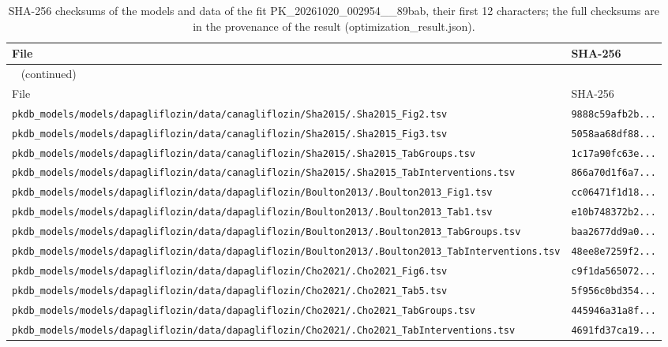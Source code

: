 \begin{longtable}{ll}
\caption{SHA-256 checksums of the models and data of the fit PK\_20261020\_002954\_\_89bab, their first 12 characters; the full checksums are in the provenance of the result (optimization\_result.json).}\label{tab:checksums:PK_20261020_002954__89bab} \\
\toprule
File & SHA-256 \\
\midrule
\endfirsthead
\multicolumn{2}{l}{\small\tablename~\thetable{} (continued)} \\
\toprule
File & SHA-256 \\
\midrule
\endhead
\bottomrule
\endlastfoot
\texttt{pkdb\_models/models/dapagliflozin/data/canagliflozin/Sha2015/.Sha2015\_Fig2.tsv} & \texttt{9888c59afb2b...} \\
\texttt{pkdb\_models/models/dapagliflozin/data/canagliflozin/Sha2015/.Sha2015\_Fig3.tsv} & \texttt{5058aa68df88...} \\
\texttt{pkdb\_models/models/dapagliflozin/data/canagliflozin/Sha2015/.Sha2015\_TabGroups.tsv} & \texttt{1c17a90fc63e...} \\
\texttt{pkdb\_models/models/dapagliflozin/data/canagliflozin/Sha2015/.Sha2015\_TabInterventions.tsv} & \texttt{866a70d1f6a7...} \\
\texttt{pkdb\_models/models/dapagliflozin/data/dapagliflozin/Boulton2013/.Boulton2013\_Fig1.tsv} & \texttt{cc06471f1d18...} \\
\texttt{pkdb\_models/models/dapagliflozin/data/dapagliflozin/Boulton2013/.Boulton2013\_Tab1.tsv} & \texttt{e10b748372b2...} \\
\texttt{pkdb\_models/models/dapagliflozin/data/dapagliflozin/Boulton2013/.Boulton2013\_TabGroups.tsv} & \texttt{baa2677dd9a0...} \\
\texttt{pkdb\_models/models/dapagliflozin/data/dapagliflozin/Boulton2013/.Boulton2013\_TabInterventions.tsv} & \texttt{48ee8e7259f2...} \\
\texttt{pkdb\_models/models/dapagliflozin/data/dapagliflozin/Cho2021/.Cho2021\_Fig6.tsv} & \texttt{c9f1da565072...} \\
\texttt{pkdb\_models/models/dapagliflozin/data/dapagliflozin/Cho2021/.Cho2021\_Tab5.tsv} & \texttt{5f956c0bd354...} \\
\texttt{pkdb\_models/models/dapagliflozin/data/dapagliflozin/Cho2021/.Cho2021\_TabGroups.tsv} & \texttt{445946a31a8f...} \\
\texttt{pkdb\_models/models/dapagliflozin/data/dapagliflozin/Cho2021/.Cho2021\_TabInterventions.tsv} & \texttt{4691fd37ca19...} \\

\end{longtable}

